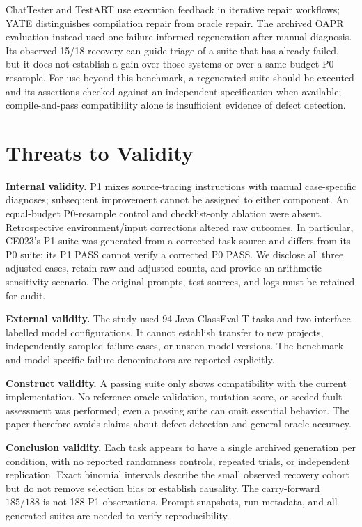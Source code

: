\documentclass[conference]{IEEEtran}
\begin{document}
ChatTester \cite{yuan2024chattester} and TestART \cite{gu2024testart} use execution feedback in iterative repair workflows; YATE \cite{konstantinou2025yate} distinguishes compilation repair from oracle repair. The archived OAPR evaluation instead used one failure-informed regeneration after manual diagnosis. Its observed 15/18 recovery can guide triage of a suite that has already failed, but it does not establish a gain over those systems or over a same-budget P0 resample. For use beyond this benchmark, a regenerated suite should be executed and its assertions checked against an independent specification when available; compile-and-pass compatibility alone is insufficient evidence of defect detection.

\section{Threats to Validity}
\textbf{Internal validity.} P1 mixes source-tracing instructions with manual case-specific diagnoses; subsequent improvement cannot be assigned to either component. An equal-budget P0-resample control and checklist-only ablation were absent. Retrospective environment/input corrections altered raw outcomes. In particular, CE023's P1 suite was generated from a corrected task source and differs from its P0 suite; its P1 PASS cannot verify a corrected P0 PASS. We disclose all three adjusted cases, retain raw and adjusted counts, and provide an arithmetic sensitivity scenario. The original prompts, test sources, and logs must be retained for audit.

\textbf{External validity.} The study used 94 Java ClassEval-T tasks and two interface-labelled model configurations. It cannot establish transfer to new projects, independently sampled failure cases, or unseen model versions. The benchmark and model-specific failure denominators are reported explicitly.

\textbf{Construct validity.} A passing suite only shows compatibility with the current implementation. No reference-oracle validation, mutation score, or seeded-fault assessment was performed; even a passing suite can omit essential behavior. The paper therefore avoids claims about defect detection and general oracle accuracy.

\textbf{Conclusion validity.} Each task appears to have a single archived generation per condition, with no reported randomness controls, repeated trials, or independent replication. Exact binomial intervals describe the small observed recovery cohort but do not remove selection bias or establish causality. The carry-forward $185/188$ is not 188 P1 observations. Prompt snapshots, run metadata, and all generated suites are needed to verify reproducibility.
\end{document}
